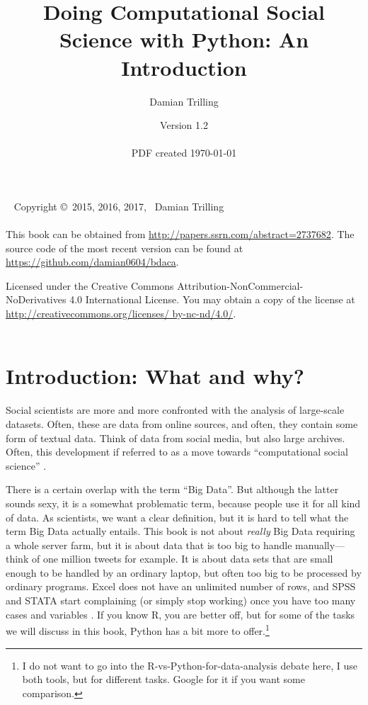 \documentclass[a4paper,12pt]{book}
\title{Doing Computational Social Science with Python: An Introduction}
\author{Damian Trilling}
\date{Version 1.2\\ ~ \\  \footnotesize{PDF created \today}}
\begin{document}
\frontmatter

\maketitle

\newpage

{~\vfill
\thispagestyle{empty}
\setlength{\parindent}{0pt}
\setlength{\parskip}{\baselineskip}
Copyright \copyright\ 2015, 2016, 2017, \the\year\ Damian Trilling\\
\vspace{.25cm} \\
This book can be obtained from \url{http://papers.ssrn.com/abstract=2737682}. The source code of the most recent version can be found at \url{https://github.com/damian0604/bdaca}.


\par Licensed under the Creative Commons Attribution-NonCommercial-NoDerivatives 4.0 International License. You may obtain a copy of the license at \url{http://creativecommons.org/licenses/ by-nc-nd/4.0/}. \\
\vspace{.5cm} \\
\ccbyncnd

}


\newpage

\tableofcontents


\chapter{Introduction: What and why?}

Social scientists are more and more confronted with the analysis of large-scale datasets. Often, these are data from online sources, and often, they contain some form of textual data. Think of data from social media, but also large archives. Often, this development if referred to as a move towards ``computational social science'' \citep{Lazer2009,Kitchin2014}.

There is a certain overlap with the term ``Big Data''. But although the latter sounds sexy, it is a somewhat problematic term, because people use it for all kind of data. As scientists, we want a clear definition, but it is hard to tell what the term Big Data actually entails. This book is not about \emph{really} Big Data requiring a whole server farm, but it is about data that is too big to handle manually---think of one million tweets for example. It is about data sets that are small enough to be handled by an ordinary laptop, but often too big to be processed by ordinary programs. Excel does not have an unlimited number of rows, and SPSS and STATA start complaining (or simply stop working) once you have too many cases and variables \citep[see, e.g.,][]{Trilling2017a}. If you know R, you are better off, but for some of the tasks we will discuss in this book, Python has a bit more to offer.\footnote{I do not want to go into the R-vs-Python-for-data-analysis debate here, I use both tools, but for different tasks. Google for it if you want some comparison.}  
\end{document}
